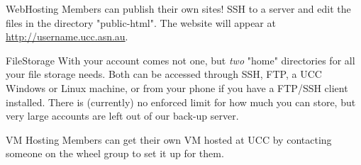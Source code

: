 	\begin{comment}
	Alternately, you can use one of several methods to check your UCC email directly.
	\begin{enumerate}
		\item alpine --- Connect via SSH and run "alpine".
		\item webmail --- Several options will be presented to you at \url{http://webmail.ucc.asn.au}
		\item mail client (eg: Thunderbird) --- The server name is \server{secure.ucc.asn.au}. Use port 993 and IMAP. With your UCC username and password.
	\end{enumerate}
	\end{comment}
\begin{uccservice}{WebHosting}
	Members can publish their own sites! SSH to a server and edit the files in the directory "public-html". The website will appear at \url{http://username.ucc.asn.au}.
\end{uccservice}
\begin{uccservice}{FileStorage}
	With your account comes not one, but \emph{two} "home" directories for all your file storage needs. Both can be accessed through SSH, FTP, a UCC Windows or Linux machine, or from your phone if you have a FTP/SSH client installed. There is (currently) no enforced limit for how much you can store, but very large accounts are left out of our back-up server.
\end{uccservice}
\begin{uccservice}{VM Hosting}
	Members can get their own VM hosted at UCC by contacting someone on the wheel group to set it up for them.
\end{uccservice}
